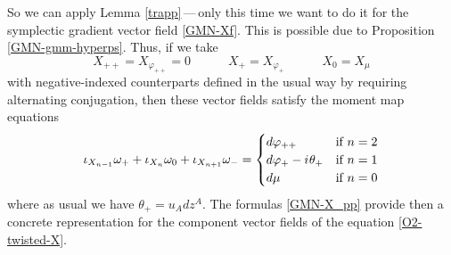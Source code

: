 \documentclass[11pt]{amsart}
\theoremstyle{remark}
\theoremstyle{remark}
\theoremstyle{definition}
\theoremstyle{definition}
\theoremstyle{definition}
\newcommand{\0}{{\scriptstyle 0'}} %
\newcommand{\1}{{\scriptstyle 1'}}
\newcommand{\A}{{\scriptscriptstyle A}} %
\newcommand{\hp}{\hspace{0.5pt}} %
\begin{document}
So we can apply Lemma \ref{trapp}\,---\,only this time we want to do it for the symplectic gradient vector field \eqref{GMN-Xf}. This is possible due to Proposition \ref{GMN-gmm-hyperps}. Thus, if we take
\begin{equation} \label{GMN-X_pp}
X_{++}  = X_{\varphi_{++}} = 0
\qquad\quad
X_+ = X_{\varphi_+}
\qquad\quad
X_0 = X_{\mu} 
\end{equation}
with negative-indexed counterparts defined in the usual way by requiring alternating conjugation, then these vector fields satisfy the moment map equations
\begin{equation} 
\iota_{X_{n-1}}\omega_+ + \iota_{X_{n}}\omega_0 + \iota_{X_{n+1}}\omega_- =
\begin{cases}
d\varphi_{++}  & \text{if $n = 2$} \\
d\varphi_+ - i \hp \theta_+ & \text{if $n = 1$} \\
d\mu & \text{if $n=0$} 
\end{cases}
\end{equation}
where as usual we have $\theta_+ = u_{\A}dz^{\A}$. The formulas \eqref{GMN-X_pp} provide then a concrete representation for the component vector fields of the equation \eqref{O2-twisted-X}. 
\end{document}
